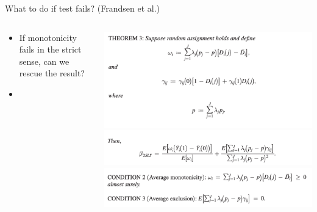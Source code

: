\documentclass[notes,11pt, aspectratio=169]{beamer}
\begin{document}
\begin{frame}{What to do if test fails? (Frandsen et al.)}
  \begin{columns}[onlytextwidth, T] %
    \begin{column}{.5\textwidth}
      \begin{itemize}
      \item If monotonicity fails in the strict sense, can we rescue the result?
      \item 
      \end{itemize}
    \end{column}%
    \hfill%
    \begin{column}{.5\textwidth}
      \includegraphics[width=\linewidth]{images/average_judge_iv1.pdf}\\
      \includegraphics[width=\linewidth]{images/average_judge_iv2.pdf}\\
      \includegraphics[width=\linewidth]{images/average_judge_iv3.pdf}
    \end{column}%
  \end{columns}
\end{frame}
\end{document}
